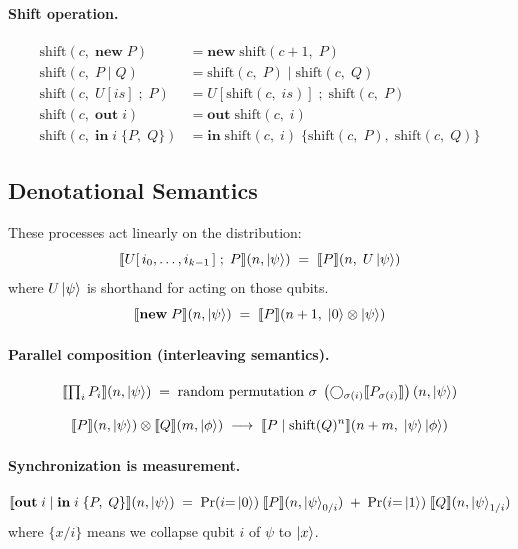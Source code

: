 \documentclass[11pt]{article}
\begin{document}
\paragraph{Shift operation.}
\begin{align*}
  \mathrm{shift}(c,\; \mathbf{new}\; P)
    &= \mathbf{new}\;\mathrm{shift}(c+1,\; P) \\
  \mathrm{shift}(c,\; P \mid Q)
    &= \mathrm{shift}(c,\; P) \mid \mathrm{shift}(c,\; Q) \\
  \mathrm{shift}(c,\; U[\mathit{is}]\;;\; P)
    &= U[\mathrm{shift}(c,\; \mathit{is})]\;;\; \mathrm{shift}(c,\; P) \\
  \mathrm{shift}(c,\; \mathbf{out}\; i)
    &= \mathbf{out}\;\mathrm{shift}(c,\; i) \\
  \mathrm{shift}(c,\; \mathbf{in}\; i\;\{P,\; Q\})
    &= \mathbf{in}\;\mathrm{shift}(c,\; i)\;\{\mathrm{shift}(c,\; P),\;
       \mathrm{shift}(c,\; Q)\}
\end{align*}

\subsection{Denotational Semantics}

These processes act linearly on the distribution:
\[
  \llbracket U[\,i_0, \ldots, i_{k-1}\,]\;;\; P \rrbracket(n, \ket{\psi})
  \;=\;
  \llbracket P \rrbracket(n,\; U\ket{\psi})
\]
where $U\ket{\psi}$ is shorthand for acting on those qubits.
\[
  \llbracket \mathbf{new}\; P \rrbracket(n, \ket{\psi})
  \;=\;
  \llbracket P \rrbracket(n+1,\; \ket{0} \otimes \ket{\psi})
\]

\paragraph{Parallel composition (interleaving semantics).}
\[
  \llbracket \textstyle\prod_i P_i \rrbracket(n, \ket{\psi})
  \;=\;
  \text{random permutation } \sigma\;
  \left(\bigcirc_{\sigma(i)}
    \llbracket P_{\sigma(i)} \rrbracket\right)(n, \ket{\psi})
\]

\[
  \llbracket P \rrbracket(n, \ket{\psi})
  \otimes
  \llbracket Q \rrbracket(m, \ket{\phi})
  \;\longrightarrow\;
  \llbracket P \mid \mathrm{shift}(Q)^n \rrbracket
    (n+m,\; \ket{\psi}\ket{\phi})
\]

\paragraph{Synchronization is measurement.}
\[
  \llbracket \mathbf{out}\; i \mid \mathbf{in}\; i\;\{P,\; Q\} \rrbracket
    (n, \ket{\psi})
  \;=\;
  \Pr(i{=}\ket{0})\;\llbracket P \rrbracket(n, \ket{\psi}_{0/i})
  \;+\;
  \Pr(i{=}\ket{1})\;\llbracket Q \rrbracket(n, \ket{\psi}_{1/i})
\]
where $\{x/i\}$ means we collapse qubit $i$ of $\psi$ to $\ket{x}$.
\end{document}
